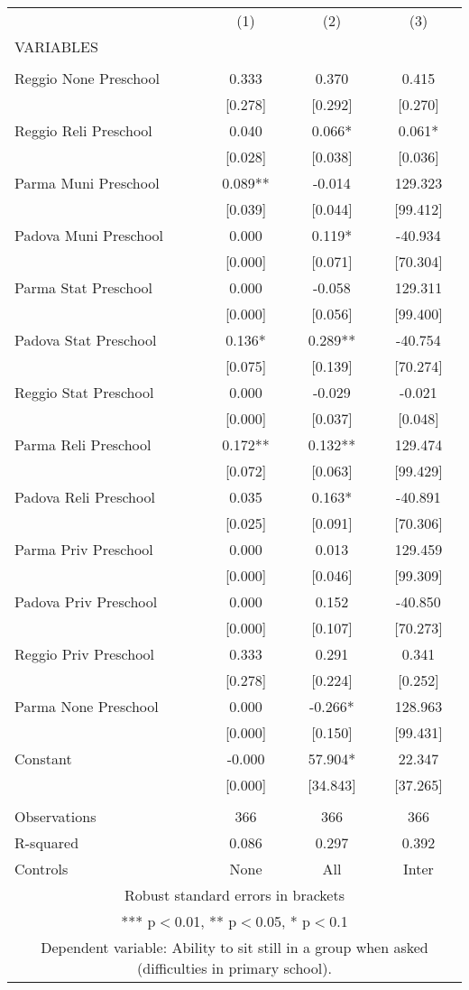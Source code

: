 \begin{tabular}{lccc} \hline
 & (1) & (2) & (3) \\
VARIABLES &  &  &  \\ \hline
 &  &  &  \\
Reggio None Preschool & 0.333 & 0.370 & 0.415 \\
 & [0.278] & [0.292] & [0.270] \\
Reggio Reli Preschool & 0.040 & 0.066* & 0.061* \\
 & [0.028] & [0.038] & [0.036] \\
Parma Muni Preschool & 0.089** & -0.014 & 129.323 \\
 & [0.039] & [0.044] & [99.412] \\
Padova Muni Preschool & 0.000 & 0.119* & -40.934 \\
 & [0.000] & [0.071] & [70.304] \\
Parma Stat Preschool & 0.000 & -0.058 & 129.311 \\
 & [0.000] & [0.056] & [99.400] \\
Padova Stat Preschool & 0.136* & 0.289** & -40.754 \\
 & [0.075] & [0.139] & [70.274] \\
Reggio Stat Preschool & 0.000 & -0.029 & -0.021 \\
 & [0.000] & [0.037] & [0.048] \\
Parma Reli Preschool & 0.172** & 0.132** & 129.474 \\
 & [0.072] & [0.063] & [99.429] \\
Padova Reli Preschool & 0.035 & 0.163* & -40.891 \\
 & [0.025] & [0.091] & [70.306] \\
Parma Priv Preschool & 0.000 & 0.013 & 129.459 \\
 & [0.000] & [0.046] & [99.309] \\
Padova Priv Preschool & 0.000 & 0.152 & -40.850 \\
 & [0.000] & [0.107] & [70.273] \\
Reggio Priv Preschool & 0.333 & 0.291 & 0.341 \\
 & [0.278] & [0.224] & [0.252] \\
Parma None Preschool & 0.000 & -0.266* & 128.963 \\
 & [0.000] & [0.150] & [99.431] \\
Constant & -0.000 & 57.904* & 22.347 \\
 & [0.000] & [34.843] & [37.265] \\
 &  &  &  \\
Observations & 366 & 366 & 366 \\
R-squared & 0.086 & 0.297 & 0.392 \\
 Controls & None & All & Inter \\ \hline
\multicolumn{4}{c}{ Robust standard errors in brackets} \\
\multicolumn{4}{c}{ *** p$<$0.01, ** p$<$0.05, * p$<$0.1} \\
\multicolumn{4}{c}{ Dependent variable: Ability to sit still in a group when asked (difficulties in primary school).} \\
\end{tabular}
